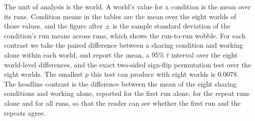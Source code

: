 The unit of analysis is the world. A world's value for a condition is the mean over its runs. Condition means
in the tables are the mean over the eight worlds of those values, and the figure after $\pm$ is the sample
standard deviation of the condition's run means across runs, which shows the run-to-run wobble. For each
contrast we take the paired difference between a sharing condition and working alone within each world, and
report the mean, a 95\% $t$ interval over the eight world-level differences, and the exact two-sided sign-flip
permutation test over the eight worlds. The smallest $p$ this test can produce with eight worlds is
$0.0078$. The headline contrast is the difference between the mean of the eight sharing conditions and working alone, reported
for the first run alone, for the repeat runs alone and for all runs, so that the reader can see whether the
first run and the repeats agree.
